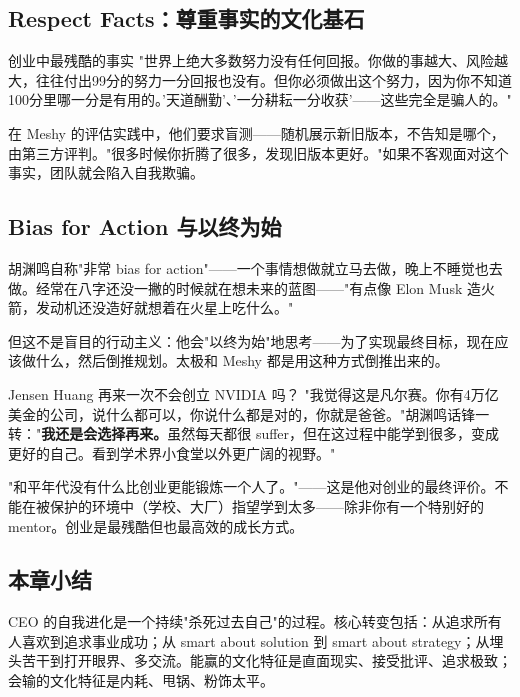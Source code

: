 \subsection{Respect Facts：尊重事实的文化基石}

\begin{warningbox}{创业中最残酷的事实}
"世界上绝大多数努力没有任何回报。你做的事越大、风险越大，往往付出99分的努力一分回报也没有。但你必须做出这个努力，因为你不知道100分里哪一分是有用的。'天道酬勤'、'一分耕耘一分收获'——这些完全是骗人的。"
\end{warningbox}

在 Meshy 的评估实践中，他们要求盲测——随机展示新旧版本，不告知是哪个，由第三方评判。"很多时候你折腾了很多，发现旧版本更好。"如果不客观面对这个事实，团队就会陷入自我欺骗。

\subsection{Bias for Action 与以终为始}

胡渊鸣自称"非常 bias for action"——一个事情想做就立马去做，晚上不睡觉也去做。经常在八字还没一撇的时候就在想未来的蓝图——"有点像 Elon Musk 造火箭，发动机还没造好就想着在火星上吃什么。"

但这不是盲目的行动主义：他会"以终为始"地思考——为了实现最终目标，现在应该做什么，然后倒推规划。太极和 Meshy 都是用这种方式倒推出来的。

\begin{knowledgebox}{Jensen Huang 再来一次不会创立 NVIDIA 吗？}
"我觉得这是凡尔赛。你有4万亿美金的公司，说什么都可以，你说什么都是对的，你就是爸爸。"胡渊鸣话锋一转："\textbf{我还是会选择再来。}虽然每天都很 suffer，但在这过程中能学到很多，变成更好的自己。看到学术界小食堂以外更广阔的视野。"
\end{knowledgebox}

"和平年代没有什么比创业更能锻炼一个人了。"——这是他对创业的最终评价。不能在被保护的环境中（学校、大厂）指望学到太多——除非你有一个特别好的 mentor。创业是最残酷但也最高效的成长方式。

\subsection{本章小结}

CEO 的自我进化是一个持续"杀死过去自己"的过程。核心转变包括：从追求所有人喜欢到追求事业成功；从 smart about solution 到 smart about strategy；从埋头苦干到打开眼界、多交流。能赢的文化特征是直面现实、接受批评、追求极致；会输的文化特征是内耗、甩锅、粉饰太平。

